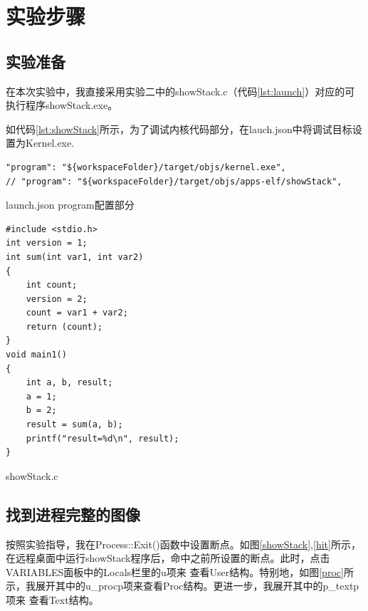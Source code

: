 \section{实验步骤}
\subsection{实验准备}

在本次实验中，我直接采用实验二中的showStack.c（代码\ref{lst:launch}）对应的可执行程序showStack.exe。

如代码\ref{lst:showStack}所示，为了调试内核代码部分，在lauch.json中将调试目标设置为Kernel.exe.

\begin{listing}[htbp]
    \begin{verbatim}
"program": "${workspaceFolder}/target/objs/kernel.exe",
// "program": "${workspaceFolder}/target/objs/apps-elf/showStack",
    \end{verbatim}
    \caption{launch.json program配置部分}\label{lst:launch}
\end{listing}

\begin{listing}[htbp]
    \begin{verbatim}
#include <stdio.h>
int version = 1;
int sum(int var1, int var2)
{
    int count;
    version = 2;
    count = var1 + var2;
    return (count);
}
void main1()
{
    int a, b, result;
    a = 1;
    b = 2;
    result = sum(a, b);
    printf("result=%d\n", result);
}
    \end{verbatim}
    \caption{showStack.c}\label{lst:showStack}
\end{listing}
\subsection{找到进程完整的图像}

按照实验指导，我在Process::Exit()函数中设置断点。如图\ref{showStack},\ref{hit}所示，
在远程桌面中运行showStack程序后，命中之前所设置的断点。此时，点击VARIABLES面板中的Locals栏里的u项来
查看User结构。特别地，如图\ref{proc}所示，我展开其中的u\_procp项来查看Proc结构。更进一步，我展开其中的p\_textp项来
查看Text结构。


